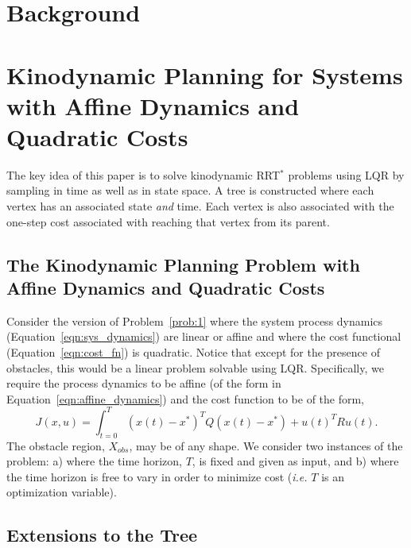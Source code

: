 \documentclass[letterpaper, 10pt, english, conference]{IEEEtran}
\begin{document}
\section{Background}



\section{Kinodynamic Planning for Systems with Affine Dynamics and Quadratic Costs}

The key idea of this paper is to solve kinodynamic RRT$^*$ problems
using LQR by sampling in time as well as in state space. A tree is
constructed where each vertex has an associated state {\em and}
time. Each vertex is also associated with the one-step cost associated
with reaching that vertex from its parent.


\subsection{The Kinodynamic Planning Problem with Affine Dynamics
and Quadratic Costs}

Consider the version of Problem~\ref{prob:1} where the system process
dynamics (Equation~\ref{eqn:sys_dynamics}) are linear or affine and
where the cost functional (Equation~\ref{eqn:cost_fn}) is
quadratic. Notice that except for the presence of obstacles, this
would be a linear problem solvable using LQR. Specifically, we require
the process dynamics to be affine (of the form in
Equation~\ref{eqn:affine_dynamics}) and the cost function to be of the
form,
\begin{equation}
J(x,u) = \int_{t=0}^{T} (x(t)-x^*)^T Q (x(t)-x^*) + u(t)^T R
u(t).
\label{eqn:affine_lqr_cost_nofinal}
\end{equation}
The obstacle region, $X_{obs}$, may be of any shape. We consider two
instances of the problem: a) where the time horizon, $T$, is fixed and
given as input, and b) where the time horizon is free to vary in order
to minimize cost ({\em i.e.} $T$ is an optimization variable).


\subsection{Extensions to the Tree}
\end{document}
